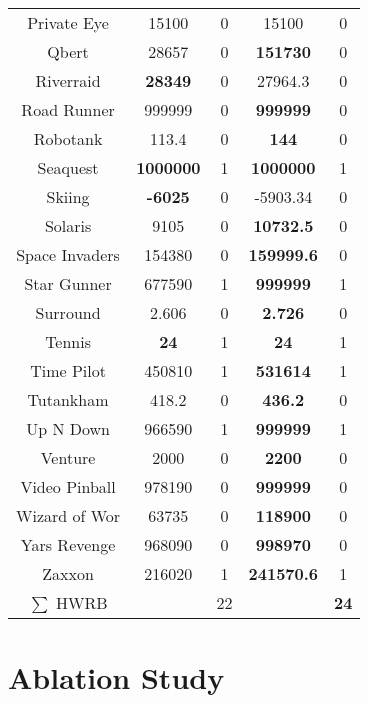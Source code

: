 \begin{table}[!hb]
\begin{center}
\begin{tabular}{c cc cc }
        Private Eye &15100          & 0 & 15100 & 0 \\   
        Qbert &28657          & 0 & \textbf{151730} & 0 \\  
        Riverraid &\textbf{28349}           & 0 & 27964.3 & 0 \\   
        Road Runner &{999999	} & 0  & \textbf{999999} &0 \\   
        Robotank &113.4           & 0 & \textbf{144} & 0 \\  
        Seaquest&\textbf{{1000000}}         & 1 & \textbf{1000000} & 1 \\  
        Skiing &\textbf{{-6025}}  & 0 & -5903.34 & 0 \\  
        Solaris &9105           & 0  & \textbf{10732.5} & 0 \\   
        Space Invaders  &{154380}         & 0 & \textbf{159999.6} & 0 \\  
        Star Gunner &{677590}         & 1 & \textbf{999999} & 1 \\  
        Surround  &2.606           & 0  & \textbf{2.726} & 0 \\  
        Tennis &\textbf{{24}}            & 1  & \textbf{24} & 1 \\   
        Time Pilot &450810	         & 1  & \textbf{531614} & 1 \\   
        Tutankham &418.2          & 0 & \textbf{436.2} & 0 \\   
        Up N Down &966590         & 1 & \textbf{999999} & 1\\  
        Venture  &2000	           & 0 & \textbf{2200} & 0 \\    
        Video Pinball &978190          & 0 & \textbf{999999} &0 \\  
        Wizard of Wor  &63735         & 0 & \textbf{118900} & 0 \\  
        Yars Revenge &968090         & 0& \textbf{998970} & 0 \\  
        Zaxxon &216020	          & 1 & \textbf{241570.6} & 1 \\  \midrule
                $\sum$ HWRB & &22   & &\textbf{24} \\ 
         \bottomrule
\end{tabular}
\end{center}
\end{table}



\clearpage

\section{Ablation Study}
\label{app: Ablation Study}


